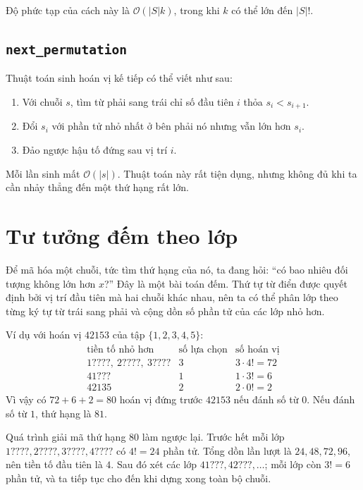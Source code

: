 \documentclass[11pt]{article}
\newcommand{\Oh}{\mathcal{O}}
\begin{document}
Độ phức tạp của cách này là \(\Oh(\lvert S\rvert k)\), trong khi \(k\) có
thể lớn đến \(\lvert S\rvert!\).

\subsection{\texorpdfstring{\texttt{next\_permutation}}{next permutation}}

Thuật toán sinh hoán vị kế tiếp có thể viết như sau:
\begin{enumerate}
  \item Với chuỗi \(s\), tìm từ phải sang trái chỉ số đầu tiên \(i\) thỏa
  \(s_i < s_{i+1}\).
  \item Đổi \(s_i\) với phần tử nhỏ nhất ở bên phải nó nhưng vẫn lớn hơn
  \(s_i\).
  \item Đảo ngược hậu tố đứng sau vị trí \(i\).
\end{enumerate}
Mỗi lần sinh mất \(\Oh(\lvert s\rvert)\). Thuật toán này rất tiện dụng, nhưng
không đủ khi ta cần nhảy thẳng đến một thứ hạng rất lớn.

\section{Tư tưởng đếm theo lớp}

Để mã hóa một chuỗi, tức tìm thứ hạng của nó, ta đang hỏi: ``có bao nhiêu đối
tượng không lớn hơn \(x\)?'' Đây là một bài toán đếm. Thứ tự từ điển được
quyết định bởi vị trí đầu tiên mà hai chuỗi khác nhau, nên ta có thể phân lớp
theo từng ký tự từ trái sang phải và cộng dồn số phần tử của các lớp nhỏ hơn.

Ví dụ với hoán vị \(42153\) của tập \(\{1,2,3,4,5\}\):
\[
\begin{array}{c|c|c}
\text{tiền tố nhỏ hơn} & \text{số lựa chọn} & \text{số hoán vị} \\
\hline
1????,\ 2????,\ 3???? & 3 & 3\cdot 4! = 72 \\
41??? & 1 & 1\cdot 3! = 6 \\
42135 & 2 & 2\cdot 0! = 2
\end{array}
\]
Vì vậy có \(72+6+2=80\) hoán vị đứng trước \(42153\) nếu đánh số từ \(0\).
Nếu đánh số từ \(1\), thứ hạng là \(81\).

Quá trình giải mã thứ hạng \(80\) làm ngược lại. Trước hết mỗi lớp
\(1????,2????,3????,4????\) có \(4!=24\) phần tử. Tổng dồn lần lượt là
\(24,48,72,96\), nên tiền tố đầu tiên là \(4\). Sau đó xét các lớp
\(41???,42???,\ldots\); mỗi lớp còn \(3!=6\) phần tử, và ta tiếp tục cho đến
khi dựng xong toàn bộ chuỗi.
\end{document}
